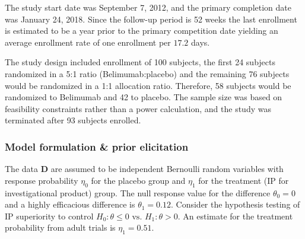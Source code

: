 \documentclass[12pt]{article}
\begin{document}
The study start date was September 7, 2012, and the primary completion date was January 24, 2018. Since the follow-up period is 52 weeks the last enrollment is estimated to be a year prior to the primary competition date yielding an average enrollment rate of one enrollment per $17.2$ days.

The study design included enrollment of 100 subjects, the first 24 subjects randomized in a 5:1 ratio (Belimumab:placebo) and the remaining 76 subjects would be randomized in a 1:1 allocation ratio. Therefore, 58 subjects would be randomized to Belimumab and 42 to placebo. The sample size was based on feasibility constraints rather than a power calculation, and the study was terminated after 93 subjects enrolled.

\subsubsection{Model formulation \& prior elicitation}\label{sec:example2model}
The data $\mathbf{D}$ are assumed to be independent Bernoulli random variables with response probability $\eta_0$ for the placebo group and $\eta_1$ for the treatment (IP for investigational product) group. The null response value for the difference $\theta_0=0$ and a highly efficacious difference is $\theta_1=0.12$. Consider the hypothesis testing of IP superiority to control $H_0:\theta\leq 0\text{ vs. }H_1: \theta>0$. An estimate for the treatment probability from adult trials is $\eta_1=0.51$.



\end{document}
